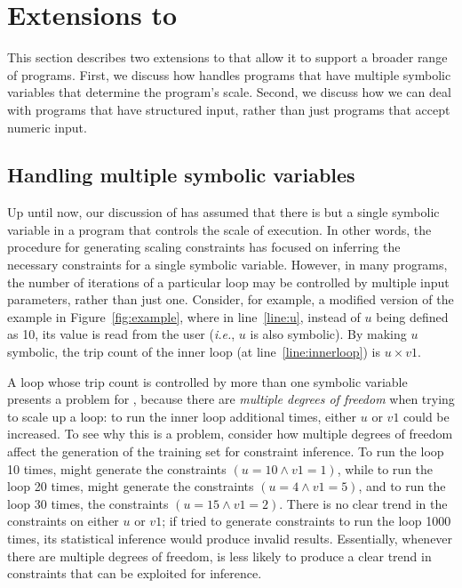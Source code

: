 \section{Extensions to \lancet}
\label{sec:extensions}

This section describes two extensions to \lancet that allow it to support a
broader range of programs. First, we discuss how \lancet handles programs that
have multiple symbolic variables that determine the program's scale. Second,
we discuss how we can deal with programs that have structured input, rather
than just programs that accept numeric input.

\subsection{Handling multiple symbolic variables}
\label{sec:multivar}

Up until now, our discussion of \lancet has assumed that there is but a single
symbolic variable in a program that controls the scale of execution. In other
words, the procedure for generating scaling constraints has focused on
inferring the necessary constraints for a single symbolic variable. However,
in many programs, the number of iterations of a particular loop may be
controlled by multiple input parameters, rather than just one. Consider, for example, a modified version of the example in Figure~\ref{fig:example}, where in line~\ref{line:u}, instead of $u$ being defined as 10, its value is read from the user ({\em i.e.}, $u$ is also symbolic). By making $u$ symbolic, the trip count of the inner loop (at line~\ref{line:innerloop}) is $u \times v1$.

A loop whose trip count is controlled by more than one symbolic variable
presents a problem for \lancet, because there are {\em multiple degrees of
freedom} when trying to scale up a loop: to run the inner loop additional
times, either $u$ or $v1$ could be increased. To see why this is a problem,
consider how multiple degrees of freedom affect the generation of the training
set for constraint inference. To run the loop 10 times, \lancet might generate
the constraints $(u = 10 \land v1 = 1)$, while to run the loop 20 times, \lancet
might generate the constraints $(u = 4 \land v1 = 5)$, and to run the loop 30
times, the constraints $(u = 15 \land v1 = 2)$. There is no clear trend in the
constraints on either $u$ or $v1$; if \lancet tried to generate constraints to
run the loop 1000 times, its statistical inference would produce invalid
results. Essentially, whenever there are multiple degrees of freedom, \lancet
is less likely to produce a clear trend in constraints that can be exploited
for inference.

